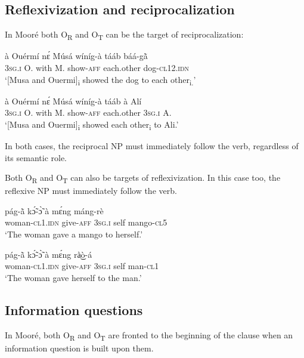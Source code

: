 \documentclass[output=paper]{langsci/langscibook}
\begin{document}
\subsection{Reflexivization and reciprocalization}\label{§5.4:reflexivization.pacchiarotti}

In Mooré both O\textsubscript{R}  and O\textsubscript{T}  can be the target of reciprocalization:

\ea
\label{ex:41.pacchiarotti}
\gll à    Ouérmí  nɛ́  Músá  wíníg-à  tááb    báá-g\`{ã} \\
\textsc{3sg.i}    O.    with  M.  show-\textsc{aff}  each.other  dog-\textsc{cl12.idn}\\
\glt `[Musa and Ouermi]\textsubscript{i} showed the dog to each other\textsubscript{i.}'
\z

\ea
\label{ex:42.pacchiarotti}
\gll à    Ouérmí  nɛ́  Músá  wíníg-à  tááb    à    Alí\\
\textsc{3sg.i}    O.    with  M.  show-\textsc{aff}  each.other  \textsc{3sg.i}     A.\\
\glt `[Musa and Ouermi]\textsubscript{i} showed each other\textsubscript{i} to Ali.'
\z

In both cases, the reciprocal NP must immediately follow the verb, regardless of its semantic role. 

Both O\textsubscript{R} and O\textsubscript{T} can also be targets of reflexivization. In this case too, the reflexive NP must immediately follow the verb.

\ea
\label{ex:43.pacchiarotti}
\gll pág-\`{ã} kɔ̃́-ɔ̃̀ à mɛ́ng máng-rè\\
woman-\textsc{cl1.idn}  give-\textsc{aff}  \textsc{3sg.i}    self  mango-\textsc{cl5}\\
\glt `The woman gave a mango to herself.'
\z

\ea
\label{ex:44.pacchiarotti}
\gll pág-\`{ã} kɔ̃́-ɔ̃̀ à mɛ́ng rà͜ò-á \\
woman-\textsc{cl1.idn}  give-\textsc{aff}  \textsc{3sg.i}    self  man-\textsc{cl1}\\
\glt `The woman gave herself to the man.'
\z

\subsection{Information questions}\label{§5.5:Information.pacchiarotti}

In Mooré, both O\textsubscript{R} and O\textsubscript{T} are fronted to the beginning of the clause when an information question is built upon them. 
\end{document}

